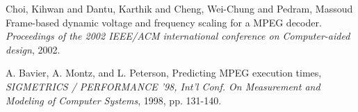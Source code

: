 \begin{thebibliography}{}


Choi, Kihwan and Dantu, Karthik and Cheng, Wei-Chung and Pedram, Massoud
Frame-based dynamic voltage and frequency scaling for a MPEG decoder.
\emph{Proceedings of the 2002 IEEE/ACM international conference on Computer-aided design},
2002.

A. Bavier, A. Montz, and L. Peterson,
Predicting MPEG execution times,
\emph{SIGMETRICS / PERFORMANCE ’98, Int’l Conf. On Measurement and Modeling of Computer Systems}, 
1998, pp. 131-140.


\end{thebibliography}
